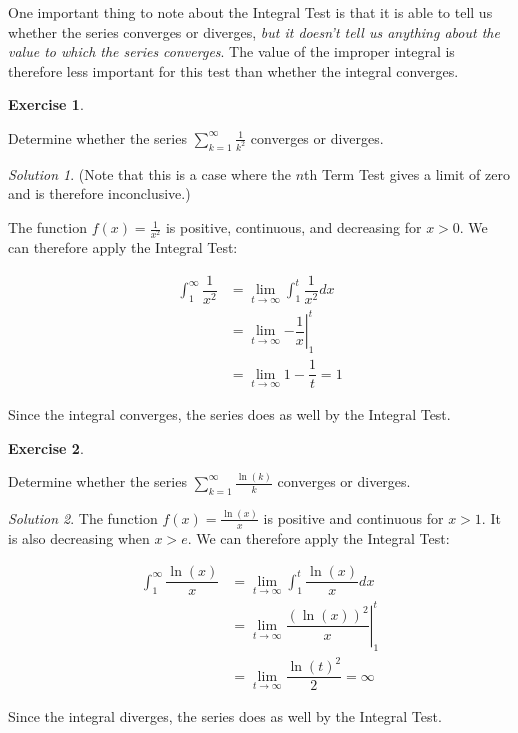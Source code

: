 \documentclass[
]{book}
\theoremstyle{definition}
\theoremstyle{definition}
\theoremstyle{definition}
\newtheorem{exercise}{Exercise}[chapter]
\theoremstyle{definition}
\theoremstyle{remark}
\newtheorem*{solution}{Solution}
\begin{document}
One important thing to note about the Integral Test is that it is able to tell us whether the series converges or diverges, \emph{but it doesn't tell us anything about the value to which the series converges}. The value of the improper integral is therefore less important for this test than whether the integral converges.

\begin{exercise}
\protect\hypertarget{exr:unlabeled-div-190}{}\label{exr:unlabeled-div-190}

Determine whether the series \(\displaystyle \sum_{k=1}^\infty \frac{1}{k^2}\) converges or diverges.

\end{exercise}

\begin{solution}

(Note that this is a case where the \(n\)th Term Test gives a limit of zero and is therefore inconclusive.)

The function \(f(x)=\frac{1}{x^2}\) is positive, continuous, and decreasing for \(x>0\). We can therefore apply the Integral Test:

\begin{align*}
\int_1^\infty \dfrac{1}{x^2} &= \lim_{t\to\infty} \int_1^t \dfrac{1}{x^2} dx \\
&= \lim_{t\to\infty} \left. -\dfrac{1}{x} \right|_{1}^t\\
&= \lim_{t\to\infty}  1-\dfrac{1}{t} = 1
\end{align*}

Since the integral converges, the series does as well by the Integral Test.

\end{solution}

\begin{exercise}
\protect\hypertarget{exr:unlabeled-div-192}{}\label{exr:unlabeled-div-192}

Determine whether the series \(\displaystyle \sum_{k=1}^\infty \frac{\ln(k)}{k}\) converges or diverges.

\end{exercise}

\begin{solution}

The function \(f(x)=\frac{\ln(x)}{x}\) is positive and continuous for \(x>1\). It is also decreasing when \(x>e\). We can therefore apply the Integral Test:

\begin{align*}
\int_1^\infty \dfrac{\ln(x)}{x} &= \lim_{t\to\infty} \int_1^t \dfrac{\ln(x)}{x} dx \\
&= \lim_{t\to\infty} \left. \dfrac{(\ln(x))^2}{x} \right|_{1}^t\\
&= \lim_{t\to\infty}  \dfrac{\ln(t)^2}{2} = \infty
\end{align*}

Since the integral diverges, the series does as well by the Integral Test.

\end{solution}
\end{document}
